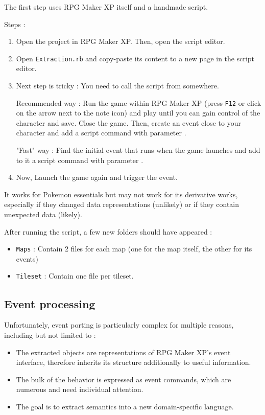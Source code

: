 \documentclass[11pt]{article}
\begin{document}
The first step uses RPG Maker XP itself and a handmade script.

Steps :
\begin{enumerate}
	\item Open the project in RPG Maker XP. Then, open the script editor.
	
	\item Open \verb|Extraction.rb| and copy-paste its content to a new page in the script editor.
	
	\item Next step is tricky : You need to call the script from somewhere. 
	
	Recommended way : Run the game within RPG Maker XP (press \verb|F12| or click on the arrow next to the note icon) and play until you can gain control of the character and save. Close the game. Then, create an event close to your character and add a script command with parameter . 
	
	"Fast" way : Find the initial event that runs when the game launches and add to it a script command with parameter .
	
	\item Now, Launch the game again and trigger the event.
\end{enumerate}

It works for Pokemon essentials but may not work for its derivative works, especially if they changed data representations (unlikely) or if they contain unexpected data (likely).

After running the script, a few new folders should have appeared :
\begin{itemize}
	\item \verb|Maps| : Contain 2 files for each map (one for the map itself, the other for its events)
	\item \verb|Tileset| : Contain one file per tileset.
\end{itemize}



\subsection{Event processing}

Unfortunately, event porting is particularly complex for multiple reasons, including but not limited to :
\begin{itemize}
	\item The extracted objects are representations of RPG Maker XP's event interface, therefore inherits its structure additionally to useful information.
	
	\item The bulk of the behavior is expressed as event commands, which are numerous and need individual attention.
	
	\item The goal is to extract semantics into a new domain-specific language.
\end{itemize}
\end{document}
